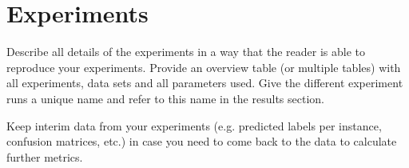 \chapter{Experiments}\label{sec:experiments}

Describe all details of the experiments in a way that the reader is able to reproduce your experiments.
Provide an overview table (or multiple tables) with all experiments, data sets and all parameters used.
Give the different experiment runs a unique name and refer to this name in the results section.

Keep interim data from your experiments (e.g. predicted labels per instance, confusion matrices, etc.) in case you need to come back to the data to calculate further metrics.



\newpage
